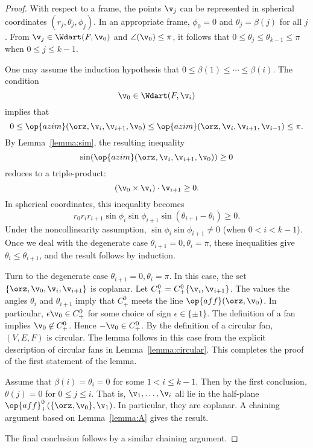 \figQTICQYN %

\begin{proof}  
  With respect to a frame, the points $\v_j$ can be represented in
  spherical coordinates $(r_j,\theta_j,\phi_j)$.  In an appropriate
  frame, $\phi_0=0$ and $\theta_j=\beta(j)$ for all $j$.  From
  $\v_j\in \Wdart(F,\v_0)$ and $\angle(\v_0)\le\pi$, it follows that
  $0\le\theta_j\le\theta_{k-1}\le\pi$ when $0\le j\le k-1$.

One may assume the induction hypothesis that $0\le \beta(1)\le\cdots\le
\beta(i)$.  The condition
\[ 
\v_0\in \Wdart(F,\v_i)
\] 
implies that
\[ 
  0 \le \op{azim}(\orz,\v_i,\v_{i+1},\v_0)
\le \op{azim}(\orz,\v_i,\v_{i+1},\v_{i-1})\le\pi.
\] 
By Lemma~\ref{lemma:sim}, the resulting inequality
\[ 
\sin(\op{azim}(\orz,\v_i,\v_{i+1},\v_0))\ge 0
\] 
reduces to a triple-product:
\[ 
(\v_0 \times \v_i)\cdot \v_{i+1}\ge 0.
\] 
In spherical coordinates, this inequality becomes
\begin{equation}\label{eqn:triple-product}
r_0r_ir_{i+1}\sin\phi_i\sin\phi_{i+1}\sin(\theta_{i+1}-\theta_i)\ge0.
\end{equation}
Under the noncollinearity assumption, $\sin\phi_i\sin\phi_{i+1}\ne0$
(when $0< i < k-1$).  Once we deal with the degenerate
case $\theta_{i+1}=0,\theta_i=\pi$, these inequalities give
$\theta_i\le \theta_{i+1}$, and the result follows by induction.

Turn to the degenerate case $\theta_{i+1}=0,\theta_i=\pi$.  In this
case, the set $\{\orz,\v_0,\v_i,\v_{i+1}\}$ is coplanar.  Let
$C^0_+=C^0_+\{\v_i,\v_{i+1}\}$.  The values the angles $\theta_i$ and
$\theta_{i+1}$ imply that $C^0_+$ meets the line
$\op{aff}(\orz,\v_0)$. In particular, $\epsilon \v_0\in C^0_+$ for
some choice of sign $\epsilon\in\{\pm 1\}$.  The definition of a fan
implies $\v_0\not\in C^0_+$. Hence $-\v_0\in C^0_+$.  By the
definition of a circular fan, $(V,E,F)$ is circular.  The lemma
follows in this case from the explicit description of circular fans in
Lemma~\ref{lemma:circular}.  This completes the proof of the first
statement of the lemma.

Assume that $\beta(i)=\theta_i=0$ for some $1<i\le k-1$.  Then by the first
conclusion, $\theta(j)=0$ for $0\le j\le i$.  That is, 
$\v_1,\ldots,\v_i$ all lie in the half-plane
$\op{aff}^0_+(\{\orz,\v_0\},\v_1)$.  In particular, they are coplanar.
A chaining argument based on Lemma~\ref{lemma:A} gives the result.

The final conclusion follows by a similar chaining argument.
\end{proof}


